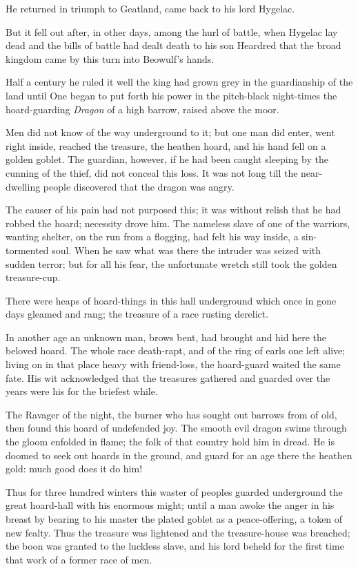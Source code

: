 \documentclass[a4paper]{article}
\begin{document}
{He returned in triumph to Geatland,
came back to his lord Hygelac.

But it fell out after, in other days,
among the hurl of battle, when Hygelac lay dead
and the bills of battle had dealt death to his son Heardred
that the broad kingdom came by this turn
into Beowulf’s hands.

Half a century he ruled it well
the king had grown grey in the guardianship of the land 
until One began to put forth his power in the pitch-black night-times
the hoard-guarding \textit{Dragon} of a high barrow, raised above the moor.

Men did not know
of the way underground to it; but one man did enter,
went right inside, reached the treasure,
the heathen hoard, and his hand fell
on a golden goblet. The guardian, however,
if he had been caught sleeping by the cunning of the thief,
did not conceal this loss. It was not long till the near-
dwelling people discovered that the dragon was angry.

The causer of his pain had not purposed this;
it was without relish that he had robbed the hoard;
necessity drove him. The nameless slave
of one of the warriors, wanting shelter,
on the run from a flogging, had felt his way inside,
a sin-tormented soul. When he saw what was there
the intruder was seized with sudden terror;
but for all his fear, the unfortunate wretch
still took the golden treasure-cup.

There were heaps of hoard-things in this hall underground
which once in gone days gleamed and rang;
the treasure of a race rusting derelict.

In another age an unknown man,
brows bent, had brought and hid here
the beloved hoard. The whole race
death-rapt, and of the ring of earls
one left alive; living on in that place
heavy with friend-loss, the hoard-guard
waited the same fate. His wit acknowledged
that the treasures gathered and guarded over the years
were his for the briefest while.

The Ravager of the night,
the burner who has sought out barrows from of old,
then found this hoard of undefended joy.
The smooth evil dragon swims through the gloom
enfolded in flame; the folk of that country
hold him in dread. He is doomed to seek out
hoards in the ground, and guard for an age there
the heathen gold: much good does it do him!

Thus for three hundred winters this waster of peoples
guarded underground the great hoard-hall
with his enormous might; until a man awoke
the anger in his breast by bearing to his master
the plated goblet as a peace-offering,
a token of new fealty. Thus the treasure was lightened
and the treasure-house was breached; the boon was granted
to the luckless slave, and his lord beheld
for the first time that work of a former race of men.

}
\end{document}
